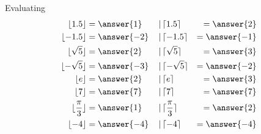 \documentclass{ximera}
\begin{document}
\begin{exercise} Evaluating \\

\begin{align*}
\lfloor 1.5 \rfloor  &=  \answer{1}       & \, | \, &    \lceil 1.5 \rceil  &=  \answer{2}  \\
\lfloor -1.5 \rfloor  &=  \answer{-2}       & \, | \, &    \lceil -1.5 \rceil  &=  \answer{-1}  \\
\lfloor \sqrt{5} \rfloor  &=  \answer{2}  & \, | \, &    \lceil \sqrt{5} \rceil  &=  \answer{3}  \\
\lfloor -\sqrt{5} \rfloor  &=  \answer{-3}  & \, | \, &    \lceil -\sqrt{5} \rceil  &=  \answer{-2}  \\
\lfloor e \rfloor  &=  \answer{2}  & \, | \, &    \lceil e \rceil  &=  \answer{3}  \\
\lfloor  7 \rfloor  &=  \answer{7}  & \, | \, &    \lceil 7 \rceil  &=  \answer{7}  \\
\lfloor \frac{\pi}{3} \rfloor  &=  \answer{1}  & \, | \, &    \lceil \frac{\pi}{3} \rceil  &=  \answer{2}  \\
\lfloor -4 \rfloor  &=  \answer{-4}  & \, | \, &    \lceil -4 \rceil  &=  \answer{-4}  
\end{align*}


\end{exercise}
\end{document}
